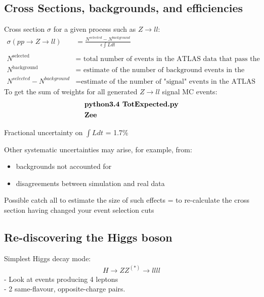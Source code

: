 \subsection{Cross Sections, backgrounds, and efficiencies}
Cross section $\sigma$ for a given process such as $Z \rightarrow ll$:
\begin{align}
    \sigma (pp \rightarrow Z \rightarrow ll) &= \frac{N^{selected} -  N^{background}}{\epsilon \int L dt}
    \\\\
    N^{\text{selected}} &= \text{ total number of events in the ATLAS data that pass the final selection cuts}
    \\
    N^{\text{background}} &= \text{ estimate of the number of background events in the selected data sample}
    \\
    N^{selected} -  N^{background} &= \text{estimate of the number of "signal" events in the ATLAS data for the targeted physics process}
\end{align}
To get the sum of weights for all generated $Z \rightarrow ll$ signal MC events:
\begin{align}
    & \text{\textbf{python3.4 TotExpected.py}}
    \\
    & \text{\textbf{Zee}}
\end{align}

Fractional uncertainty on $\int L dt$ = 1.7\%

Other systematic uncertainties may arise, for example, from:
\begin{itemize}
    \item backgrounds not accounted for
    \item disagreements between simulation and real data
\end{itemize}
Possible catch all to estimate the size of such effects = to re-calculate the cross section having changed your event selection cuts

\subsection{Re-discovering the Higgs boson}
Simplest Higgs decay mode:
\begin{align}
    H \rightarrow ZZ^{(*)} \rightarrow llll
\end{align}
 - Look at events producing 4 leptons\\
 - 2 same-flavour, opposite-charge pairs.


